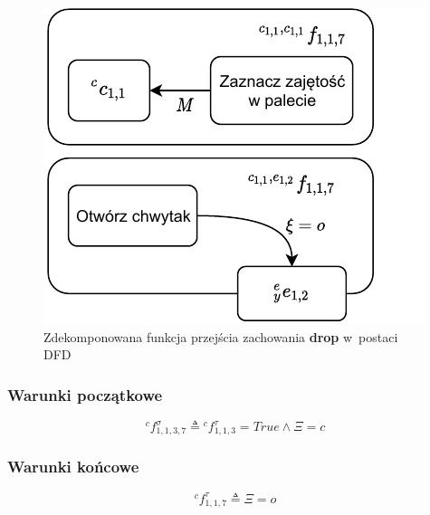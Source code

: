 \begin{figure}[H]
    \centering
    \includegraphics[width=\columnwidth]{figures/ISR-cs-fp-drop.pdf}
    \caption{Zdekomponowana funkcja przejścia zachowania \textbf{drop} w~postaci DFD}
    \label{fig:cs-fp-drop}
\end{figure}

\subsubsection{Warunki początkowe}
\begin{equation}
    {}^{c}f^{\sigma}_{1,1,3,7} \triangleq {}^{c}f^{\tau}_{1,1,3} = True \land \Xi = c
\end{equation}

\subsubsection{Warunki końcowe}
\begin{equation}
    {}^{c}f^{\tau}_{1,1,7} \triangleq \Xi = o
\end{equation}


    
